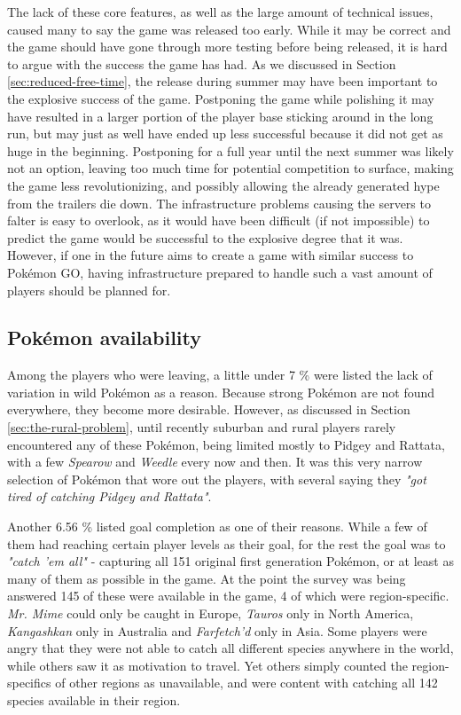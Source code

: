 The lack of these core features, as well as the large amount of technical issues, caused many to say the game was released too early. While it may be correct and the game should have gone through more testing before being released, it is hard to argue with the success the game has had. As we discussed in Section \ref{sec:reduced-free-time}, the release during summer may have been important to the explosive success of the game. Postponing the game while polishing it may have resulted in a larger portion of the player base sticking around in the long run, but may just as well have ended up less successful because it did not get as huge in the beginning. Postponing for a full year until the next summer was likely not an option, leaving too much time for potential competition to surface, making the game less revolutionizing, and possibly allowing the already generated hype from the trailers die down. The infrastructure problems causing the servers to falter is easy to overlook, as it would have been difficult (if not impossible) to predict the game would be successful to the explosive degree that it was. However, if one in the future aims to create a game with similar success to Pokémon GO, having infrastructure prepared to handle such a vast amount of players should be planned for.

\subsection{Pokémon availability}
\label{sec:pokemon-availability-and-goal-completion}
Among the players who were leaving, a little under 7 \% were listed the lack of variation in wild Pokémon as a reason. Because strong Pokémon are not found everywhere, they become more desirable. However, as discussed in Section \ref{sec:the-rural-problem}, until recently suburban and rural players rarely encountered any of these Pokémon, being limited mostly to Pidgey and Rattata, with a few \emph{Spearow} and \emph{Weedle} every now and then. It was this very narrow selection of Pokémon that wore out the players, with several saying they \emph{"got tired of catching Pidgey and Rattata"}.

Another 6.56 \% listed goal completion as one of their reasons. While a few of them had reaching certain player levels as their goal, for the rest the goal was to \emph{"catch 'em all"} - capturing all 151 original first generation Pokémon, or at least as many of them as possible in the game. At the point the survey was being answered 145 of these were available in the game, 4 of which were region-specific. \emph{Mr. Mime} could only be caught in Europe, \emph{Tauros} only in North America, \emph{Kangashkan} only in Australia and \emph{Farfetch'd} only in Asia. Some players were angry that they were not able to catch all different species anywhere in the world, while others saw it as motivation to travel. Yet others simply counted the region-specifics of other regions as unavailable, and were content with catching all 142 species available in their region.

